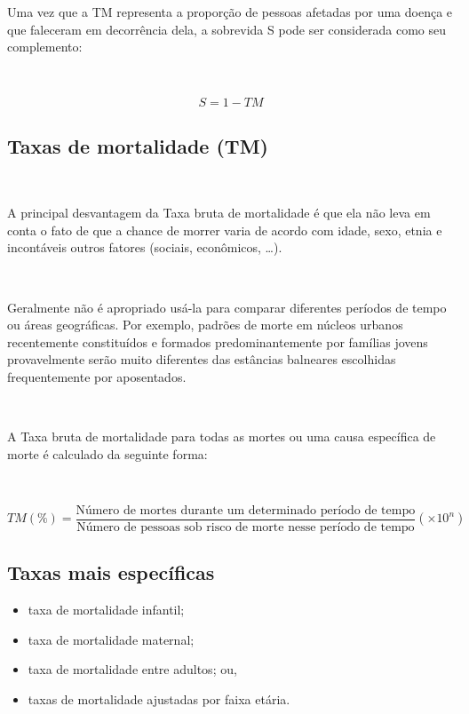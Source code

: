 \documentclass[
]{book}
\providecommand{\tightlist}{%
  \setlength{\itemsep}{0pt}\setlength{\parskip}{0pt}}
\begin{document}
\hfill\break

Uma vez que a TM representa a proporção de pessoas afetadas por uma doença e que faleceram em decorrência dela, a sobrevida S pode ser considerada como seu complemento:

~

\[
S=1-TM
\]

\hfill\break

\hypertarget{taxas-de-mortalidade-tm}{%
\subsection{Taxas de mortalidade (TM)}\label{taxas-de-mortalidade-tm}}

~

A principal desvantagem da Taxa bruta de mortalidade é que ela não leva em conta o fato de que a chance de morrer varia de acordo com idade, sexo, etnia e incontáveis outros fatores (sociais, econômicos, \dots).

~

Geralmente não é apropriado usá-la para comparar diferentes períodos de tempo ou áreas geográficas. Por exemplo, padrões de morte em núcleos urbanos recentemente constituídos e formados predominantemente por famílias jovens provavelmente serão muito diferentes das estâncias balneares escolhidas frequentemente por aposentados.

~

A Taxa bruta de mortalidade para todas as mortes ou uma causa específica de morte é calculado da seguinte forma:

~

\[
TM(\%)=\frac{\text{Número de mortes durante um determinado período de tempo}}{\text{Número de pessoas sob risco de morte nesse período de tempo}} (\times 10^{n})
\]

\hfill\break

\hypertarget{taxas-mais-especuxedficas}{%
\subsection{Taxas mais específicas}\label{taxas-mais-especuxedficas}}

\hfill\break

\begin{itemize}
\tightlist
\item
  taxa de mortalidade infantil;\\
\item
  taxa de mortalidade maternal;\\
\item
  taxa de mortalidade entre adultos; ou,\\
\item
  taxas de mortalidade ajustadas por faixa etária.
\end{itemize}
\end{document}
